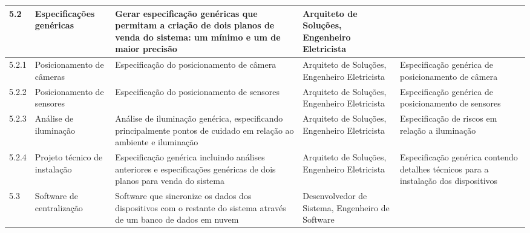 \begin{longtable}{  l  p{}  p{}  p{}  p{}  }
	\midrule
	5.2         & Especificações genéricas                               & Gerar especificação genéricas que permitam a criação de dois planos de venda do sistema: um mínimo e um de maior precisão                                                 & Arquiteto de Soluções, Engenheiro Eletricista                                                  &                                                                                                          \\*
	\midrule
	5.2.1       & Posicionamento de câmeras                                & Especificação do posicionamento de câmera                                                                                                                                     & Arquiteto de Soluções, Engenheiro Eletricista                                                  & Especificação genérica de posicionamento de câmera                                                   \\*
	\midrule
	5.2.2       & Posicionamento de sensores                                & Especificação do posicionamento de sensores                                                                                                                                    & Arquiteto de Soluções, Engenheiro Eletricista                                                  & Especificação genérica de posicionamento de sensores                                                  \\*
	\midrule
	5.2.3       & Análise de iluminação                                  & Análise de iluminação genérica, especificando principalmente pontos de cuidado em relação ao ambiente e iluminação                                                       & Arquiteto de Soluções, Engenheiro Eletricista                                                  & Especificação de riscos em relação a iluminação                                                    \\*
	\midrule
	5.2.4       & Projeto técnico de instalação                          & Especificação genérica incluindo análises anteriores e especificações genéricas de dois planos para venda do sistema                                                      & Arquiteto de Soluções, Engenheiro Eletricista                                                  & Especificação genérica contendo detalhes técnicos para a instalação dos dispositivos               \\*
	\midrule
	5.3         & Software de centralização                               & Software que sincronize os dados dos dispositivos com o restante do sistema através de um banco de dados em nuvem                                                               & Desenvolvedor de Sistema, Engenheiro de Software                                                 &                                                                                                          \\*

\end{longtable}
